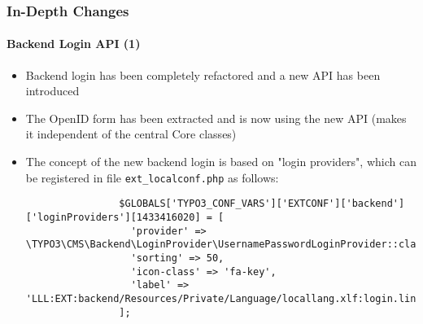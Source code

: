 
\begin{frame}[fragile]
	\frametitle{In-Depth Changes}
	\framesubtitle{Backend Login API (1)}

	\lstset{basicstyle=\tiny\ttfamily}

	\begin{itemize}

		\item Backend login has been completely refactored and a new API has been introduced

		\item The OpenID form has been extracted and is now using the new API
			(makes it independent of the central Core classes)

		\item The concept of the new backend login is based on "login providers", which
			can be registered in file \texttt{ext\_localconf.php} as follows:

			\begin{lstlisting}
				$GLOBALS['TYPO3_CONF_VARS']['EXTCONF']['backend']['loginProviders'][1433416020] = [
				  'provider' => \TYPO3\CMS\Backend\LoginProvider\UsernamePasswordLoginProvider::class,
				  'sorting' => 50,
				  'icon-class' => 'fa-key',
				  'label' => 'LLL:EXT:backend/Resources/Private/Language/locallang.xlf:login.link'
				];
			\end{lstlisting}

	\end{itemize}

\end{frame}


